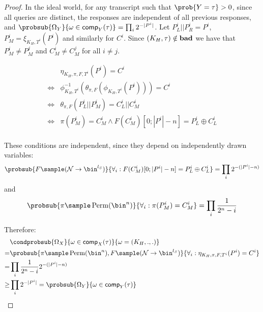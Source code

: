 \documentclass[eprint.tex]{subfiles}
\begin{document}
\begin{proof}
    In the ideal world, for any transcript such that $\prob{Y = \tau} > 0$,
    since all queries are distinct, the responses are independent of all
    previous responses, and
    $\probsub{\Omega_Y}{\omega \in \comp_Y(\tau)} = \prod_i 2^{-|P^i|}$.
    Let $P_L^i || P_R^i = P^i$, $P_M^i = \xi_{K_H, T^i}(P^i)$ and similarly for $C^i$.
    Since $(K_H, \tau) \notin \operatorname{\mathbf{bad}}$ we have that $P_M^i \neq P_M^j$
    and $C_M^i \neq C_M^j$ for all $i \neq j$.

    \begin{align*}
        & \eta_{K_H, \pi, F, T^i}(P^i) = C^i\\
        \Leftrightarrow & \phi_{K_H,T^i}^{-1}(\theta_{\pi, F}(\phi_{K_H,T^i}(P^i))) = C^i\\
        \Leftrightarrow & \theta_{\pi, F}(P_L^i || P_M^i) = C_L^i || C_M^i \\
        \Leftrightarrow & \pi(P_M^i) = C_M^i \wedge F(C_M^i)[0;|P^i| - n] = P_L^i \oplus C_L^i \\
    \end{align*}

    These conditions are independent, since they depend on independently drawn
    variables:
    \begin{displaymath}
        \probsub{
            F \sample (\mathcal{N} \rightarrow \bin^{l_S})
        }{
            \forall_i : F(C_M^i)[0;|P^i| - n] = P_L^i \oplus C_L^i
        } = \prod_i 2^{-(|P^i| - n)}
    \end{displaymath}
    and
    \begin{displaymath}
        \probsub{
            \pi \sample \Perm(\bin^n)
        }{
            \forall_i : \pi(P_M^i) = C_M^i
        } = \prod_i \frac{1}{2^n - i}
    \end{displaymath}

    Therefore:
    \begin{align*}
        &\condprobsub{\Omega_X}{\omega \in \comp_X(\tau)}{\omega = (K_H, ., .)} \\
        =& \probsub{
            \pi \sample \Perm(\bin^n),
            F \sample (\mathcal{N} \rightarrow \bin^{l_S})
        }{
            \forall_i : \eta_{K_H, \pi, F, T^i}(P^i) = C^i
        } \\
        =& \prod_i \frac{1}{2^n - i}2^{-(|P^i| - n)} \\
        \geq & \prod_i 2^{-|P^i|} = \probsub{\Omega_Y}{\omega \in \comp_Y(\tau)} \qedhere \\
    \end{align*}
\end{proof}
\end{document}
